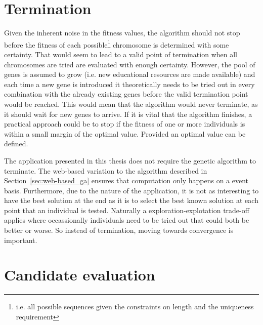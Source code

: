 \section{Termination}
\label{sec:approach_termination}
Given the inherent noise in the fitness values, the algorithm should not stop
before the fitness of each possible\footnote{i.e. all possible sequences given
the constraints on length and the uniqueness requirement} chromosome is determined
with some certainty. That would seem to lead to a valid point of termination
when all chromosomes are tried are evaluated with enough certainty. However,
the pool of genes is assumed to grow (i.e. new educational resources are made
available) and each time a new gene is introduced it theoretically needs to be
tried out in every combination with the already existing genes before the valid
termination point would be reached. This would mean that the algorithm would
never terminate, as it should wait for new genes to arrive. If it is vital that
the algorithm finishes, a practical approach could be to stop if the fitness of
one or more individuals is within a small margin of the optimal value. Provided
an optimal value can be defined.

The application presented in this thesis does not require the genetic algorithm
to terminate. The web-based variation to the algorithm described in
Section~\ref{sec:web-based_ga} ensures that computation only happens on a event
basis. Furthermore, due to the nature of the application, it is not
as interesting to have the best solution at the end as it is to select the best
known solution at each point that an individual is tested. Naturally a
exploration-explotation trade-off applies where occassionally individuals need
to be tried out that could both be better or worse. So instead of termination,
moving towards convergence is important.

\section{Candidate evaluation}
\label{sec:approach_evaluation}
